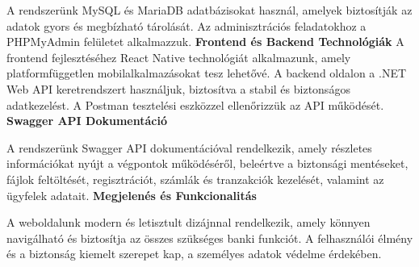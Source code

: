 \documentclass[colorlinks]{thesis-kando}
\theoremstyle{definition}
\theoremstyle{remark}
\begin{document}
A rendszerünk MySQL és MariaDB adatbázisokat használ, amelyek biztosítják az adatok gyors és megbízható tárolását. Az adminisztrációs feladatokhoz a PHPMyAdmin felületet alkalmazzuk.
\newline\newline
\textbf{Frontend és Backend Technológiák}
A frontend fejlesztéséhez React Native technológiát alkalmazunk, amely platformfüggetlen mobilalkalmazásokat tesz lehetővé. A backend oldalon a .NET Web API keretrendszert használjuk, biztosítva a stabil és biztonságos adatkezelést. A Postman tesztelési eszközzel ellenőrizzük az API működését.
\newline\newline
\textbf{Swagger API Dokumentáció}

A rendszerünk Swagger API dokumentációval rendelkezik, amely részletes információkat nyújt a végpontok működéséről, beleértve a biztonsági mentéseket, fájlok feltöltését, regisztrációt, számlák és tranzakciók kezelését, valamint az ügyfelek adatait.
\newline\newline
\textbf{Megjelenés és Funkcionalitás}

A weboldalunk modern és letisztult dizájnnal rendelkezik, amely könnyen navigálható és biztosítja az összes szükséges banki funkciót. A felhasználói élmény és a biztonság kiemelt szerepet kap, a személyes adatok védelme érdekében.
\newline\newline
\end{document}
